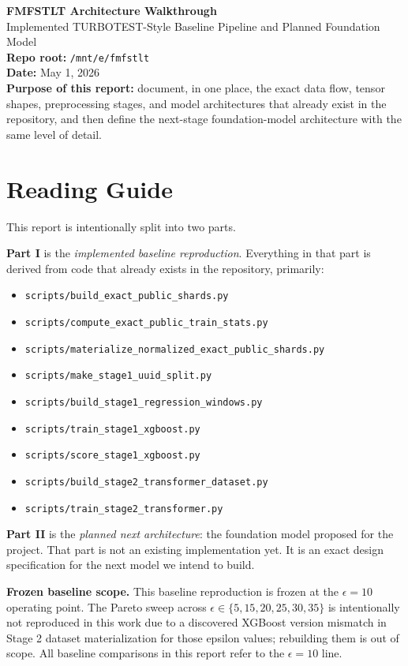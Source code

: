 \documentclass[11pt]{article}
\begin{document}
{\LARGE \textbf{FMFSTLT Architecture Walkthrough}}\\
{\large Implemented TURBOTEST-Style Baseline Pipeline and Planned Foundation Model}\\

\textbf{Repo root:} \texttt{/mnt/e/fmfstlt}\\
\textbf{Date:} May 1, 2026\\
\textbf{Purpose of this report:} document, in one place, the exact data flow, tensor shapes, preprocessing stages, and model architectures that already exist in the repository, and then define the next-stage foundation-model architecture with the same level of detail.

\tableofcontents
\newpage

\section{Reading Guide}

This report is intentionally split into two parts.

\textbf{Part I} is the \emph{implemented baseline reproduction}. Everything in that part is derived from code that already exists in the repository, primarily:
\begin{itemize}
\item \texttt{scripts/build\_exact\_public\_shards.py}
\item \texttt{scripts/compute\_exact\_public\_train\_stats.py}
\item \texttt{scripts/materialize\_normalized\_exact\_public\_shards.py}
\item \texttt{scripts/make\_stage1\_uuid\_split.py}
\item \texttt{scripts/build\_stage1\_regression\_windows.py}
\item \texttt{scripts/train\_stage1\_xgboost.py}
\item \texttt{scripts/score\_stage1\_xgboost.py}
\item \texttt{scripts/build\_stage2\_transformer\_dataset.py}
\item \texttt{scripts/train\_stage2\_transformer.py}
\end{itemize}

\textbf{Part II} is the \emph{planned next architecture}: the foundation model proposed for the project. That part is not an existing implementation yet. It is an exact design specification for the next model we intend to build.

\textbf{Frozen baseline scope.} This baseline reproduction is frozen at the \(\epsilon = 10\) operating point. The Pareto sweep across \(\epsilon \in \{5,15,20,25,30,35\}\) is intentionally not reproduced in this work due to a discovered XGBoost version mismatch in Stage 2 dataset materialization for those epsilon values; rebuilding them is out of scope. All baseline comparisons in this report refer to the \(\epsilon = 10\) line.
\end{document}
